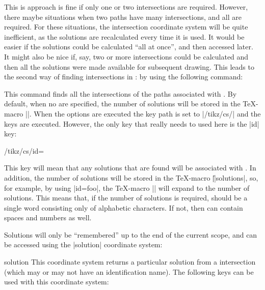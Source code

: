   This is approach is fine if only one or two intersections are 
  required. However, there maybe situations when two paths have
  many intersections, and all are required. For these situations, the
  intersection coordinate system will be quite inefficient, as 
  the solutions are recalculated every time it is used. It would be
  easier if the solutions could be calculated ``all at once'', and
  then accessed later. It might also be nice if, say, two or
  more intersections could be calculated and then all the solutions
  were made available for subsequent drawing. This leads to the
  second way of finding intersections in \tikzname: by using the
  following command:

\begin{command}{\tikzintersectnamedpaths{}}
  
  This command finds all the intersections of the paths associated 
  with  . 
  By default, when no  are specified, the number of 
  solutions will be stored in the \TeX-macro 
  |\solutions|.   
  When the options are executed the key path is set to |/tikz/cs/|
  and the  keys are executed. However, the only key 
  that really needs to used here is the |id| key:
  
\begin{key}{/tikz/cs/id=}
  
  This key will mean that any solutions that are found will be
  associated with . In addition, the number of solutions 
  will be stored in the \TeX-macro |\||solutions|, so, 
  for example, by using |id=foo|, the \TeX-macro |\foosolutions|  will 
  expand to the number of solutions. This means that, if the number
  of solutions is required,  should be a single word 
  consisting only of alphabetic characters. If not, then 
  can contain spaces and numbers as well. 
\end{key}
 
  Solutions will only be ``remembered'' up to the end of the current
  scope, and can be accessed using the |solution| coordinate system:
    
\begin{coordinatesystem}{solution}
  This coordinate system returns a particular solution from 
  a intersection (which may or may not have an identification 
  name). The following keys can be used with this coordinate
  system:


\end{coordinatesystem}
\end{command}
